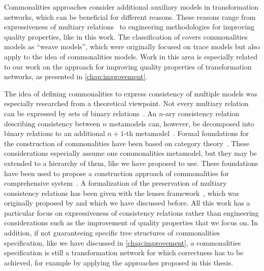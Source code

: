 Commonalities approaches consider additional auxiliary models in transformation networks, which can be beneficial for different reasons.
These reasons range from expressiveness of multiary relations~\cite{stevens2020BidirectionalTransformationLarge-SoSym,stunkel2018MultimodelCorrespondence-ICPS} to engineering methodologies for improving quality properties, like in this work.
The classification of \textcite{kolovos2008a} covers commonalities models as \enquote{weave models}, which were originally focused on trace models but also apply to the idea of commonalities models.
Work in this area is especially related to our work on the \commonalities approach for improving quality properties of transformation networks, as presented in \autoref{chap:improvement}.

The idea of defining commonalities to express consistency of multiple models was especially researched from a theoretical viewpoint.
Not every multiary relation can be expressed by sets of binary relations~\cite{stevens2020BidirectionalTransformationLarge-SoSym}.
An $n$-ary consistency relation describing consistency between $n$ metamodels can, however, be decomposed into binary relations to an additional $n+1$-th metamodel~\cite{stevens2020BidirectionalTransformationLarge-SoSym}.
Formal foundations for the construction of commonalities have been based on category theory~\cite{stunkel2018MultimodelCorrespondence-ICPS}.
These considerations especially assume one commonalities metamodel, but they may be extended to a hierarchy of them, like we have proposed to use.
These foundations have been used to propose a construction approach of commonalities for comprehensive system~\cite{stunkel2020MultipleModelSynchronization-FASE}.
A formalization of the preservation of multiary consistency relations has been given with the lenses framework~\cite{diskin2018MultiModelSynchronization-FASE}, which was originally proposed by \textcite{foster2007combinators-TPLS} and which we have discussed before.
All this work has a particular focus on expressiveness of consistency relations rather than engineering considerations such as the improvement of quality properties that we focus on.
In addition, if not guaranteeing specific tree structures of commonalities specification, like we have discussed in \autoref{chap:improvement}, a commonalities specification is still a transformation network for which correctness has to be achieved, for example by applying the approaches proposed in this thesis.

